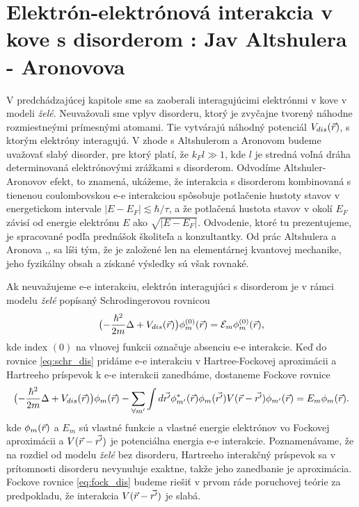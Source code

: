 \section
{Elektrón-elektrónová interakcia v kove s disorderom : Jav Altshulera - Aronovova}

 V predchádzajúcej kapitole sme sa zaoberali interagujúcimi elektrónmi v kove v modeli {\it želé}. Neuvažovali sme vplyv disorderu, ktorý je zvyčajne tvorený náhodne rozmiestneými prímesnými atomami. Tie vytvárajú náhodný potenciál $V_{dis}(\vec{r})$, s ktorým elektróny interagujú. V zhode s Altshulerom a Aronovom budeme uvažovať slabý disorder, pre ktorý
 platí, že $k_F l \gg 1$, kde $l$ je stredná voľná dráha determinovaná elektrónovými zrážkami s disorderom. Odvodíme Altshuler-Aronovov efekt, to znamená, ukážeme, že interakcia s disorderom kombinovaná s tienenou coulombovskou e-e interakciou
 spôsobuje potlačenie hustoty stavov v energetickom intervale $|E-E_F| \lesssim \hbar/\tau$, a že potlačená hustota stavov v okolí $E_F$ závisí od energie elektrónu $E$ ako $\sqrt{|E-E_F|}$.
 Odvodenie, ktoré tu prezentujeme, je spracované podľa prednášok školiteľa a konzultantky. Od prác Altshulera a Aronova \cite{Altshuler1},\cite{Altshuler3},\cite{Altshuler4}
 sa líši tým, že je založené len na elementárnej kvantovej mechanike, jeho fyzikálny obsah a získané výsledky sú však rovnaké.



Ak neuvažujeme e-e interakciu, elektrón interagujúci s disorderom je v rámci modelu {\it želé} popísaný Schrodingerovou rovnicou
\begin{equation}
\label{eq:schr_dis}
\bigl(-\frac{\hbar^2}{2m}\Delta + V_{dis}(\vec{r})\bigr)\phi_m^{(0)}(\vec{r})=\mathcal{E}_m\phi_m^{(0)}(\vec{r}) \text{,}
\end{equation}
kde index $(0)$ na vlnovej funkcii označuje absenciu e-e interakcie.
Keď do rovnice \eqref{eq:schr_dis} pridáme e-e interakciu v Hartree-Fockovej aproximácii a Hartreeho príspevok k e-e interakcii zanedbáme, dostaneme Fockove rovnice
\begin{equation}
 \label{eq:fock_dis}
 \bigl(-\frac{\hbar^2}{2m}\Delta + V_{dis}(\vec{r}) \bigr)\phi_m(\vec{r})-\sum_{\forall m'} \int d\vec{r'} \phi^*_{m'}(\vec{r})\phi_{m}(\vec{r'})V(\vec{r}-\vec{r'})\phi_{m'}(\vec{r})=E_m\phi_m(\vec{r}) \text{.}
\end{equation}
 kde $\phi_m(\vec{r})$ a $E_m$ sú vlastné funkcie a vlastné energie elektrónov vo Fockovej aproximácii a $V(\vec{r}-\vec{r'})$ je potenciálna energia e-e interakcie. Poznamenávame, že na rozdiel od modelu {\it želé} bez disorderu, Hartreeho interakčný príspevok sa v prítomnosti disorderu
nevynuluje exaktne, takže jeho zanedbanie je aproximácia.
Fockove rovnice \eqref{eq:fock_dis} budeme riešiť v prvom ráde poruchovej teórie za predpokladu, že
interakcia $V(\vec{r}-\vec{r'})$ je slabá.

